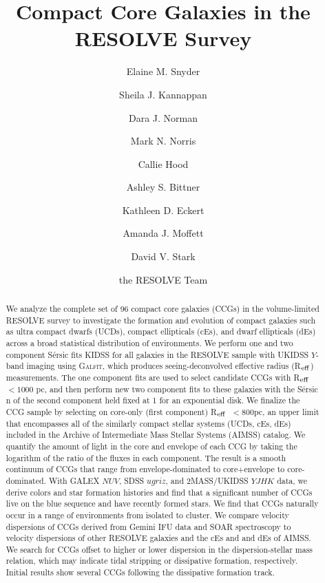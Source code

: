 \documentclass[iop,apj]{emulateapj}
\newcommand{\Reff}{R$_{\rm eff}$}
\begin{document}
\title{Compact Core Galaxies in the RESOLVE Survey}
\author{Elaine M. Snyder}
\author{Sheila J. Kannappan}
\author{Dara J. Norman}
\author{Mark N. Norris}
\author{Callie Hood}
\author{Ashley S. Bittner}
\author{Kathleen D. Eckert}
\author{Amanda J. Moffett}
\author{David V. Stark}
\author{the RESOLVE Team}
\begin{abstract}
We analyze the complete set of 96 compact core galaxies (CCGs) in the volume-limited RESOLVE survey to investigate the formation and evolution of compact galaxies such as ultra compact dwarfs (UCDs), compact ellipticals (cEs), and dwarf ellipticals (dEs) across a broad statistical distribution of environments. We perform one and two component S\'ersic fits KIDSS for all galaxies in the RESOLVE sample with UKIDSS $Y$-band imaging using \textsc{Galfit}, which produces seeing-deconvolved effective radius (\Reff) measurements. The one component fits are used to select candidate CCGs with \Reff\ $< 1000$ pc, and then perform new two component fits to these galaxies with the S\'ersic n of the second component held fixed at 1 for an exponential disk. We finalize the CCG sample by selecting on core-only (first component) \Reff\ $<800$pc, an upper limit that encompasses all of the similarly compact stellar systems (UCDs, cEs, dEs) included in the Archive of Intermediate Mass Stellar Systems (AIMSS) catalog. We quantify the amount of light in the core and envelope of each CCG by taking the logarithm of the ratio of the fluxes in each component. The result is a smooth continuum of CCGs that range from envelope-dominated to core+envelope to core-dominated. With GALEX $NUV$, SDSS $ugriz$, and 2MASS/UKIDSS $YJHK$ data, we derive colors and star formation histories and find that a significant number of CCGs live on the blue sequence and have recently formed stars. We find that CCGs naturally occur in a range of environments from isolated to cluster. We compare velocity dispersions of CCGs derived from Gemini IFU data and SOAR spectroscopy to velocity dispersions of other RESOLVE galaxies and the cEs and and dEs of AIMSS. We search for CCGs offset to higher or lower dispersion in the dispersion-stellar mass relation, which may indicate tidal stripping or dissipative formation, respectively. Initial results show several CCGs following the dissipative formation track.
\end{abstract}
\end{document}
